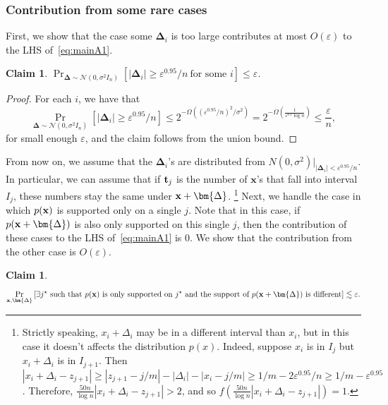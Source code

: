 \documentclass[10pt,a4paper]{article}
\newtheorem{claim}[thm]{Claim}
\newcommand\card[1]{\left| {#1} \right|}
\newcommand\Prob[2]{{\Pr_{#1}\left[ {#2} \right]}}
\newcommand\eps{\varepsilon}
\renewcommand\geq{\geqslant}
\renewcommand\leq{\leqslant}
\newcommand{\De}{\Delta}
\def\ll{\lesssim}
\begin{document}
\subsubsection{Contribution from some rare cases}
First, we show that the case some $\bm{\De}_i$ is too large contributes at most $O(\eps)$
to the LHS of~\eqref{eq:mainA1}.
\begin{claim}\label{cl:A-1}
	$\Prob{\bm{\De}\sim\mathcal{N}(0,\sigma^2 I_n)}{\card{\bm{\De}_i}\geq \eps^{0.95}/n~\text{for some $i$}}\leq \eps$.
\end{claim}
\begin{proof}
For each $i$, we have that
\[
\Prob{\bm{\De}\sim\mathcal{N}(0,\sigma^2 I_n)}{\card{\bm{\De}_i}\geq \eps^{0.95}/n}
\leq 2^{-\Omega((\eps^{0.95}/n)^2/\sigma^2)} = 2^{-\Omega\left(\frac{1}{\eps^{0.1}\log n}\right)}
\leq \frac{\eps}{n},
\]
for small enough $\eps$,
and the claim follows from the union bound.
\end{proof}
From now on, we assume that the $\bm{\De}_i$'s are distributed from $N(0,\sigma^2)|_{|\bm{\De}_i| < \eps^{0.95}/n}$.
In particular, we can assume that if ${\bf t}_j$ is the number of $\bm{x}$'s that fall into interval $I_j$, these numbers stay the same under ${\bf x}+\bm{\De}$.
\footnote{Strictly speaking, $x_i + \De_i$ may be in a different interval than $x_i$, but in this case it doesn't affects the distribution $p(x)$.
Indeed, suppose $x_i$ is in $I_j$ but $x_i + \De_i$ is in $I_{j+1}$. Then
$\card{x_i + \De_i - z_{j+1}}\geq \card{z_{j+1} - j/m} - \card{\De_i} - \card{x_i - j/m}
\geq 1/m - 2\eps^{0.95}/n\geq 1/m - \eps^{0.95}$. Therefore, $\frac{50n}{\log n}\card{x_i + \De_i - z_{j+1}} > 2$, and
so $f(\frac{50n}{\log n}\card{x_i + \De_i - z_{j+1}}) = 1$.
}
Next, we handle the case in which $p({\bf x})$ is supported only on a single $j$.
Note that in this case, if $p({\bf x}+\bm{\De})$ is also only supported on this single $j$,
then the contribution of these cases to the LHS of~\eqref{eq:mainA1} is $0$.
We show that the contribution from the other case is $O(\eps)$.
\begin{claim}\label{cl:A-3}
	\[\Prob{{\bf x},\bm{\De}}{\text{$\exists j^{\star}$ such that $p({\bf x})$ is only supported on $j^{\star}$
        and the support of $p({\bf x}+\bm{\De})$ is different}}\ll\eps.\]
\end{claim}
\end{document}

